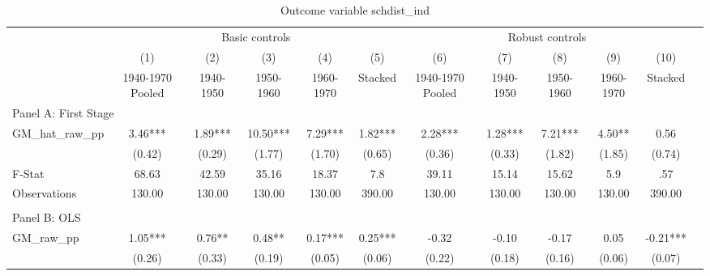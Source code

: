  \begin{table}[htbp]\centering {} \begin{threeparttable} \caption{Outcome variable schdist\_ind } \begin{tabular}{l*{11}{c}} \toprule
          &\multicolumn{5}{c}{Basic controls}                                   &\multicolumn{5}{c}{Robust controls}                                  \\\cmidrule(lr){2-6}\cmidrule(lr){7-11}
          &\multicolumn{1}{c}{(1)}&\multicolumn{1}{c}{(2)}&\multicolumn{1}{c}{(3)}&\multicolumn{1}{c}{(4)}&\multicolumn{1}{c}{(5)}&\multicolumn{1}{c}{(6)}&\multicolumn{1}{c}{(7)}&\multicolumn{1}{c}{(8)}&\multicolumn{1}{c}{(9)}&\multicolumn{1}{c}{(10)}\\
          &\multicolumn{1}{c}{1940-1970 Pooled}&\multicolumn{1}{c}{1940-1950}&\multicolumn{1}{c}{1950-1960}&\multicolumn{1}{c}{1960-1970}&\multicolumn{1}{c}{Stacked}&\multicolumn{1}{c}{1940-1970 Pooled}&\multicolumn{1}{c}{1940-1950}&\multicolumn{1}{c}{1950-1960}&\multicolumn{1}{c}{1960-1970}&\multicolumn{1}{c}{Stacked}\\
\cmidrule(lr){1-11}
\multicolumn{10}{l}{Panel A: First Stage}\\
\cmidrule(lr){1-11}
GM\_hat\_raw\_pp&      3.46***&      1.89***&     10.50***&      7.29***&      1.82***&      2.28***&      1.28***&      7.21***&      4.50** &      0.56   \\
          &    (0.42)   &    (0.29)   &    (1.77)   &    (1.70)   &    (0.65)   &    (0.36)   &    (0.33)   &    (1.82)   &    (1.85)   &    (0.74)   \\
\midrule
F-Stat    &     68.63   &     42.59   &     35.16   &     18.37   &       7.8   &     39.11   &     15.14   &     15.62   &       5.9   &       .57   \\
Observations&    130.00   &    130.00   &    130.00   &    130.00   &    390.00   &    130.00   &    130.00   &    130.00   &    130.00   &    390.00   \\
\cmidrule[\heavyrulewidth](lr){1-11} \\ \cmidrule[\heavyrulewidth](lr){1-11}
\multicolumn{10}{l}{Panel B: OLS}\\
\cmidrule(lr){1-11}
GM\_raw\_pp &      1.05***&      0.76** &      0.48** &      0.17***&      0.25***&     -0.32   &     -0.10   &     -0.17   &      0.05   &     -0.21***\\
          &    (0.26)   &    (0.33)   &    (0.19)   &    (0.05)   &    (0.06)   &    (0.22)   &    (0.18)   &    (0.16)   &    (0.06)   &    (0.07)   \\

\end{tabular}
\end{threeparttable}
\end{table}
